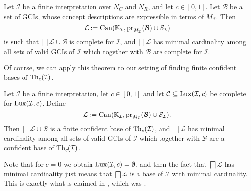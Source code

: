 \begin{Theorem}
  \label{thm:minimal-cardinality}
  Let $\mathcal{I}$ be a finite interpretation over $N_C$ and $N_R$, and let $c \in
  [0,1]$.  Let $\mathcal{B}$ be a set of GCIs, whose concept descriptions are expressible
  in terms of $M_{\mathcal{I}}$.  Then
  \begin{equation*}
    \mathcal{L} := \operatorname{Can}({\mathbb{K}}_{\mathcal{I}}, \operatorname{pr}_{M_{\mathcal{I}}}(\mathcal{B})
    \cup \mathcal{S}_{\mathcal{I}})
  \end{equation*}
  is such that $\bigsqcap \mathcal{L} \cup \mathcal{B}$ is complete for $\mathcal{I}$, and
  $\bigsqcap \mathcal{L}$ has minimal cardinality among all sets of valid GCIs of
  $\mathcal{I}$ which together with $\mathcal{B}$ are complete for $\mathcal{I}$.
\end{Theorem}

Of course, we can apply this theorem to our setting of finding finite confident bases of
$\operatorname{Th}_c(\mathcal{I})$.

\begin{Corollary}
  \label{cor:minimal-cardinality}
  Let $\mathcal{I}$ be a finite interpretation, let $c \in [0,1]$ and let $\mathcal{C}
  \subseteq \operatorname{Lux}(\mathcal{I}, c)$ be complete for $\operatorname{Lux}(\mathcal{I}, c)$.  Define
  \begin{equation*}
    \mathcal{L} := \operatorname{Can}({\mathbb{K}}_{\mathcal{I}}, \operatorname{pr}_{M_{\mathcal{I}}}(\mathcal{B})
    \cup \mathcal{S}_{\mathcal{I}}).
  \end{equation*}
  Then $\bigsqcap \mathcal{L} \cup \mathcal{B}$ is a finite confident base of
  $\operatorname{Th}_c(\mathcal{I})$, and $\bigsqcap \mathcal{L}$ has minimal cardinality among all sets
  of valid GCIs of $\mathcal{I}$ which together with $\mathcal{B}$ are a confident base of
  $\operatorname{Th}_c(\mathcal{I})$.
\end{Corollary}

Note that for $c = 0$ we obtain $\operatorname{Lux}(\mathcal{I}, c) = \emptyset$, and then the fact that
$\bigsqcap \mathcal{L}$ has minimal cardinality just means that $\bigsqcap \mathcal{L}$ is
a base of $\mathcal{I}$ with minimal cardinality.  This is exactly what is claimed in
, which was \cite[Theorem~5.18]{Diss-Felix}.

